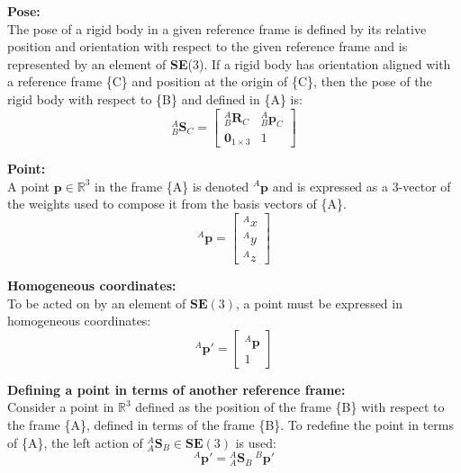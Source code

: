 		\textbf{Pose:}\\
		The pose of a rigid body in a given reference frame is defined by its relative position and orientation with respect to the given reference frame and is represented by an element of \textbf{SE}(3). If a rigid body has orientation aligned with a reference frame \{C\} and position at the origin of \{C\}, then the pose of the rigid body with respect to \{B\} and defined in \{A\} is:
		\begin{equation}
			{^{A}_{B}\mathbf{S}^{}_{C}} = 
			\begin{bmatrix}
				^{A}_{B}\mathbf{R}^{}_{C}	& 	^{A}_{B}\mathbf{p}^{}_{C}\\
				\textbf{0}_{1 \times 3} & 1						  
			\end{bmatrix}
		\end{equation}		
		
		\textbf{Point:}\\
		A point $\mathbf{p} \in \mathbb{R}^3$ in the frame \{A\} is denoted $^A\mathbf{p}$ and is expressed as a 3-vector of the weights used to compose it from the basis vectors of \{A\}.
		\begin{equation}
			^{A}\mathbf{p} = 
			\begin{bmatrix}
				^{A}x \\
				^{A}y \\
				^{A}z
			\end{bmatrix}
		\end{equation}
		
		\textbf{Homogeneous coordinates:}\\
		To be acted on by an element of $\mathbf{SE}(3)$, a point must be expressed in homogeneous coordinates:
		\begin{equation}
			^{A}\mathbf{p'} = 
			\begin{bmatrix}
				^{A}\mathbf{p} \\
				1
			\end{bmatrix}
		\end{equation}
		
		\textbf{Defining a point in terms of another reference frame:}\\
		Consider a point in $\mathbb{R}^3$ defined as the position of the frame \{B\} with respect to the frame \{A\}, defined in terms of the frame \{B\}. To redefine the point in terms of \{A\}, the left action of ${^{A}_{A}\mathbf{S}^{}_{B}} \in \mathbf{SE}(3)$ is used:
		\begin{equation}
			^{A}\mathbf{p'} = {^{A}_{A}\mathbf{S}^{}_{B}}\:^{B}\mathbf{p'}
		\end{equation}
		

